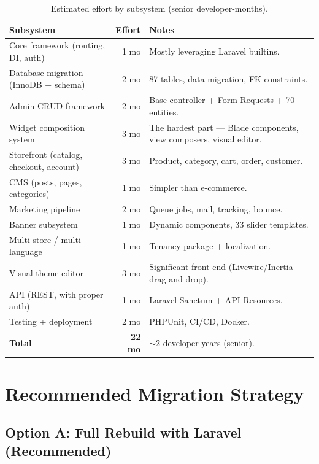 \documentclass[11pt,a4paper]{article}
\begin{document}
\begin{table}[htbp]
\centering
\caption{Estimated effort by subsystem (senior developer-months).}\label{tab:effort}
\small
\begin{tabularx}{\columnwidth}{lrX}
\toprule
\textbf{Subsystem} & \textbf{Effort} & \textbf{Notes} \\
\midrule
Core framework (routing, DI, auth) & 1 mo & Mostly leveraging Laravel builtins. \\
Database migration (InnoDB + schema) & 2 mo & 87 tables, data migration, FK constraints. \\
Admin CRUD framework & 2 mo & Base controller + Form Requests + 70+ entities. \\
Widget composition system & 3 mo & The hardest part --- Blade components, view composers, visual editor. \\
Storefront (catalog, checkout, account) & 3 mo & Product, category, cart, order, customer. \\
CMS (posts, pages, categories) & 1 mo & Simpler than e-commerce. \\
Marketing pipeline & 2 mo & Queue jobs, mail, tracking, bounce. \\
Banner subsystem & 1 mo & Dynamic components, 33 slider templates. \\
Multi-store / multi-language & 1 mo & Tenancy package + localization. \\
Visual theme editor & 3 mo & Significant front-end (Livewire/Inertia + drag-and-drop). \\
API (REST, with proper auth) & 1 mo & Laravel Sanctum + API Resources. \\
Testing + deployment & 2 mo & PHPUnit, CI/CD, Docker. \\
\midrule
\textbf{Total} & \textbf{22 mo} & $\sim$2 developer-years (senior). \\
\bottomrule
\end{tabularx}
\end{table}

\section{Recommended Migration Strategy}\label{sec:strategy}

\subsection{Option A: Full Rebuild with Laravel (Recommended)}
\end{document}
